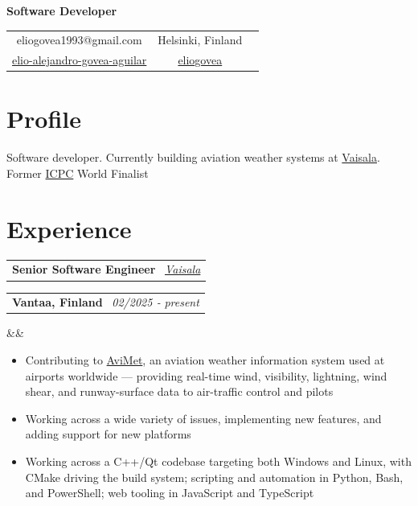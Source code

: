 \documentclass[11pt,a4paper,sans]{moderncv}
\makeatletter
\newcommand*{\customcventry}[7][.13em]{
\begin{tabular}{@{}l}
{\bfseries #4} \
{\itshape #3}
\end{tabular}
\hfill
\begin{tabular}{l@{}}
{\bfseries #5} \
{\itshape #2}
\end{tabular}
\ifx&#7&%
\else{\
\begin{minipage}{\maincolumnwidth}%
\small#7%
\end{minipage}}\fi%
\par\addvspace{#1}}
\makeatother
\begin{document}
\makecvtitle
\vspace*{-16mm}
\begin{center}\textbf{Software Developer}\end{center}
\begin{center}
\begin{tabular}{ c c c }
\faMobile \enspace eliogovea1993@gmail.com \enspace & \faHome\enspace Helsinki, Finland \\
\faLinkedin\enspace \color{blue} \href{https://www.linkedin.com/in/elio-alejandro-govea-aguilar-557598172/}{elio-alejandro-govea-aguilar} \enspace &
\faGithub\enspace \color{blue} \href{https://github.com/eliogovea}{eliogovea}
\end{tabular}
\end{center}

\section{Profile}
Software developer. Currently building aviation weather systems at {\color{blue}\href{https://www.vaisala.com/en}{Vaisala}}. Former {\color{blue}\href{https://icpc.global/ICPCID/PNF1J4PZOUVQ}{ICPC}} World Finalist

\section{Experience}

\customcventry
{02/2025 ‐ present}
{{\color{blue}\href{https://www.vaisala.com/en}{Vaisala}}}
{Senior Software Engineer}
{Vantaa, Finland}
{}
{}

\begin{itemize}[leftmargin=0.6cm, label={\textbullet}]
    \item Contributing to {\color{blue}\href{https://www.vaisala.com/en/products/systems/avimet}{AviMet}}, an aviation weather information system used at airports worldwide --- providing real-time wind, visibility, lightning, wind shear, and runway-surface data to air-traffic control and pilots
    \item Working across a wide variety of issues, implementing new features, and adding support for new platforms
    \item Working across a C++/Qt codebase targeting both Windows and Linux, with CMake driving the build system; scripting and automation in Python, Bash, and PowerShell; web tooling in JavaScript and TypeScript
\end{itemize}
\end{document}
